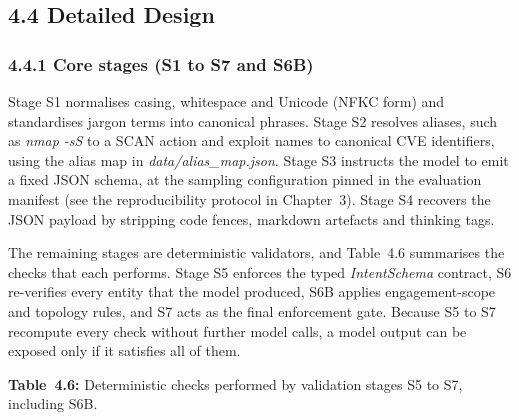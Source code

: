 \documentclass[
]{article}
\begin{document}
\hypertarget{detailed-design}{%
\subsection{4.4 Detailed Design}\label{detailed-design}}

\hypertarget{core-stages-s1-to-s7-and-s6b}{%
\subsubsection{4.4.1 Core stages (S1 to S7 and
S6B)}\label{core-stages-s1-to-s7-and-s6b}}

Stage S1 normalises casing, whitespace and Unicode (NFKC form) and
standardises jargon terms into canonical phrases. Stage S2 resolves
aliases, such as \emph{nmap -sS} to a SCAN action and exploit names to
canonical CVE identifiers, using the alias map in
\emph{data/alias\_map.json}. Stage S3 instructs the model to emit a
fixed JSON schema, at the sampling configuration pinned in the
evaluation manifest (see the reproducibility protocol in Chapter~3).
Stage S4 recovers the JSON payload by stripping code fences, markdown
artefacts and thinking tags.

The remaining stages are deterministic validators, and Table~4.6
summarises the checks that each performs. Stage S5 enforces the typed
\emph{IntentSchema} contract, S6 re-verifies every entity that the model
produced, S6B applies engagement-scope and topology rules, and S7 acts
as the final enforcement gate. Because S5 to S7 recompute every check
without further model calls, a model output can be exposed only if it
satisfies all of them.

\protect\hypertarget{_Toc900083}{}{}\textbf{Table~4.6:} Deterministic
checks performed by validation stages S5 to S7, including S6B.
\end{document}
